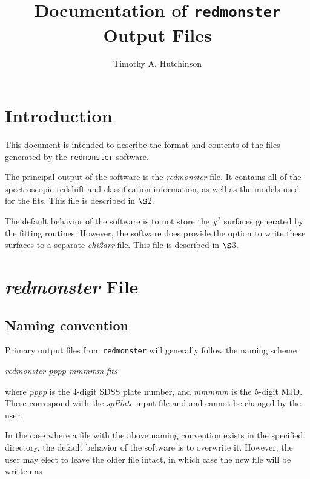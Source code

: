 \documentclass[12pt]{article}
\begin{document}
\title{Documentation of \texttt{redmonster} Output Files}

\author{Timothy A. Hutchinson}

\maketitle

\section{Introduction}

This document is intended to describe the format and contents of the files
generated by the \texttt{redmonster} software.

The principal output of the software is the \textit{redmonster} file.  It contains all of the
spectroscopic redshift and classification information, as well as the models used for the fits.
This file is described in $\S$2.

The default behavior of the software is to not store the $\chi^2$ surfaces generated by
the fitting routines.  However, the software does provide the option to write these surfaces
to a separate \textit{chi2arr} file.  This file is described in $\S$3.

\section{\textit{redmonster} File}

\subsection{Naming convention}

Primary output files from \texttt{redmonster} will generally follow the naming scheme

\begin{center}
	\textit{redmonster-pppp-mmmmm.fits}
\end{center}

where \textit{pppp} is the 4-digit SDSS plate number, and \textit{mmmmm}
is the 5-digit MJD.  These correspond with the \textit{spPlate} input file and
and cannot be changed by the user.

In the case where a file with the above naming convention exists in the specified directory, 
the default behavior of the software is to overwrite it.  However, the user may 
elect to leave the older file intact, in which case the new file will be written as
\end{document}
